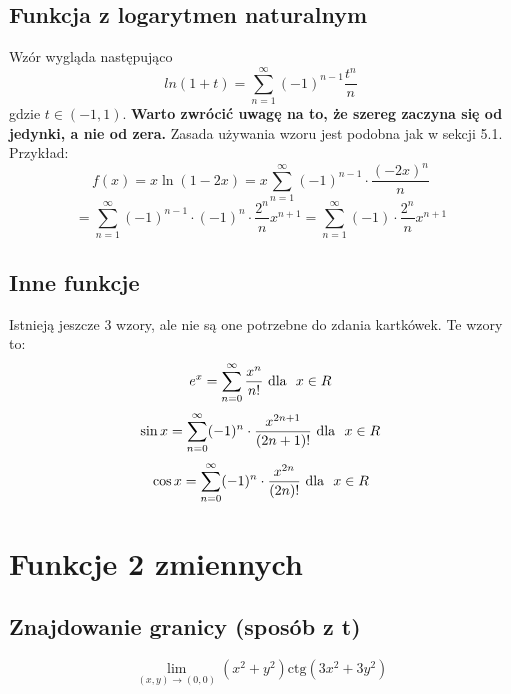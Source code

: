 \documentclass[11pt]{article}
\begin{document}
\subsection{Funkcja z logarytmen naturalnym}
\vbox{
    Wzór wygląda następująco
    \[
        ln(1 + t) = \sum_{n = 1}^{\infty}(-1)^{n - 1} \frac{t^n}{n}
    \]
    gdzie $t \in (-1, 1)$. \textbf{Warto zwrócić uwagę na to, że szereg zaczyna
    się od jedynki, a nie od zera.}
    Zasada używania wzoru jest podobna jak w sekcji 5.1. Przykład:
    \[
        f(x) = x \ln(1 - 2x) = 
        x \sum_{n = 1}^{\infty}(-1)^{n - 1} \cdot \frac{(-2x)^n}{n}
    \]
    \[
        = \sum_{n = 1}^{\infty}(-1)^{n - 1} \cdot (-1)^{n} \cdot \frac{2^n}{n} x^{n + 1}
        = \sum_{n = 1}^{\infty} (-1) \cdot \frac{2^n}{n} x^{n + 1}
    \]
}

\subsection{Inne funkcje}
\vbox{
    Istnieją jeszcze 3 wzory, ale nie są one potrzebne do zdania kartkówek.
    Te wzory to:
    \[
        e^x = \sum_{n = 0}^{\infty} \frac{x^n}{n!} \text{\space dla \space} x \in R
    \]
    \[
        \sin{x} = \sum_{n = 0}^{\infty} (-1)^n \cdot \frac{x^{2n + 1}}{(2n + 1)!} \text{\space dla \space} x \in R
    \]
    \[
        \cos{x} = \sum_{n = 0}^{\infty} (-1)^n \cdot \frac{x^{2n}}{(2n)!} \text{\space dla \space} x \in R
    \]
}

\section{Funkcje 2 zmiennych}
\subsection{Znajdowanie granicy (sposób z t)}
\vbox{
    \[
        \lim_{(x,y) \to (0,0)}(x^2 + y^2) \text{ctg} (3x^2 + 3y^2)
    \]
}
\end{document}
